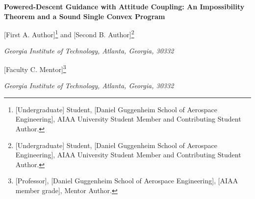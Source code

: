 
\newtheorem{definition}{Definition}
\newcommand{\R}{\mathbb{R}}
\newcommand{\F}{F_{t_f}}
\newcommand{\FX}{F^{X}_{t_f}}
\newcommand{\Pib}{\Pi_b}
\newcommand{\Tmin}{T_{\min}}
\newcommand{\Tmax}{T_{\max}}
\newcommand{\dmax}{\delta}
\newcommand{\thmax}{\vartheta_{\max}}


\begin{center}
{\fontsize{24}{28}\selectfont\bfseries Powered-Descent Guidance with Attitude Coupling: An Impossibility Theorem and a Sound
Single Convex Program\par}
\vspace{14pt}
{\large [First A. Author]\footnote{[Undergraduate] Student, [Daniel Guggenheim School of Aerospace Engineering], AIAA University Student
Member and Contributing Student Author.} and [Second B. Author]\footnote{[Undergraduate] Student, [Daniel Guggenheim School of
Aerospace Engineering], AIAA University Student Member and Contributing Student Author.}\par}
{\large\itshape Georgia Institute of Technology, Atlanta, Georgia, 30332\par}
\vspace{10pt}
{\large [Faculty C. Mentor]\footnote{[Professor], [Daniel Guggenheim School of Aerospace Engineering], [AIAA member grade], Mentor Author.}\par}
{\large\itshape Georgia Institute of Technology, Atlanta, Georgia, 30332\par}
\end{center}

